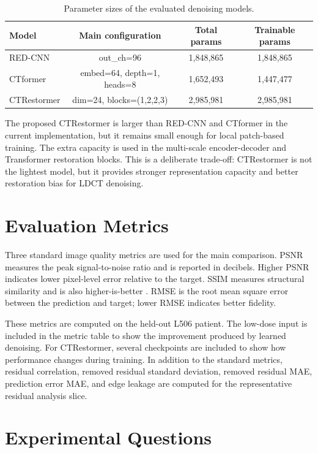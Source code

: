 \begin{table}[!htbp]
    \centering
    \caption{Parameter sizes of the evaluated denoising models.}
    \renewcommand{\arraystretch}{1.25}
    \small
    \begin{tabular}{lccc}
        \hline
        Model & Main configuration & Total params & Trainable params \\
        \hline
        RED-CNN & out\_ch=96 & 1,848,865 & 1,848,865 \\
        \hline
        CTformer & embed=64, depth=1, heads=8 & 1,652,493 & 1,447,477 \\
        \hline
        CTRestormer & dim=24, blocks=(1,2,2,3) & 2,985,981 & 2,985,981 \\
        \hline
    \end{tabular}
    \label{tab:model_size}
\end{table}

The proposed CTRestormer is larger than RED-CNN and CTformer in the current implementation, but it remains small enough for local patch-based training. The extra capacity is used in the multi-scale encoder-decoder and Transformer restoration blocks. This is a deliberate trade-off: CTRestormer is not the lightest model, but it provides stronger representation capacity and better restoration bias for LDCT denoising.

\section{Evaluation Metrics}

Three standard image quality metrics are used for the main comparison. PSNR measures the peak signal-to-noise ratio and is reported in decibels. Higher PSNR indicates lower pixel-level error relative to the target. SSIM measures structural similarity and is also higher-is-better \cite{ssim}. RMSE is the root mean square error between the prediction and target; lower RMSE indicates better fidelity.

These metrics are computed on the held-out L506 patient. The low-dose input is included in the metric table to show the improvement produced by learned denoising. For CTRestormer, several checkpoints are included to show how performance changes during training. In addition to the standard metrics, residual correlation, removed residual standard deviation, removed residual MAE, prediction error MAE, and edge leakage are computed for the representative residual analysis slice.

\section{Experimental Questions}

